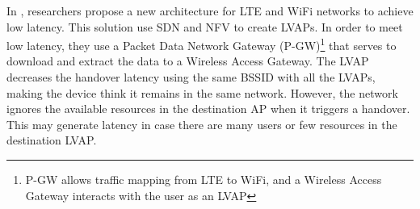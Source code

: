 In \cite{327}, researchers propose a new architecture for LTE and WiFi networks to achieve low latency. This solution use SDN and NFV to create LVAPs. In order to meet low latency, they use a Packet Data Network Gateway (P-GW)\footnote{P-GW allows traffic mapping from LTE to WiFi, and a Wireless Access Gateway interacts with the user as an LVAP} that serves to download and extract the data to a Wireless Access Gateway. The LVAP decreases the handover latency using the same BSSID with all the LVAPs, making the device think it remains in the same network. However, the network ignores the available resources in the destination AP when it triggers a handover. This may generate latency in case there are many users or few resources in the destination LVAP. \\





